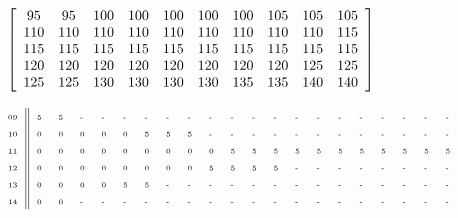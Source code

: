 \bigskip\ $\left[
\begin{array}
[c]{cccccccccc}%
95 & 95 & 100 & 100 & 100 & 100 & 100 & 105 & 105 & 105\\
110 & 110 & 110 & 110 & 110 & 110 & 110 & 110 & 110 & 115\\
115 & 115 & 115 & 115 & 115 & 115 & 115 & 115 & 115 & 115\\
120 & 120 & 120 & 120 & 120 & 120 & 120 & 120 & 125 & 125\\
125 & 125 & 130 & 130 & 130 & 130 & 135 & 135 & 140 & 140
\end{array}
\right]  \allowbreak$

$\text{%
\begin{tabular}
[c]{l||llllllllllllllllllll}%
{\tiny 09} & {\tiny 5} & {\tiny 5} & {\tiny -} & {\tiny -} & {\tiny -} &
{\tiny -} & {\tiny -} & {\tiny -} & {\tiny -} & {\tiny -} & {\tiny -} &
{\tiny -} & {\tiny -} & {\tiny -} & {\tiny -} & {\tiny -} & {\tiny -} &
{\tiny -} & {\tiny -} & {\tiny -}\\
{\tiny 10} & {\tiny 0} & {\tiny 0} & {\tiny 0} & {\tiny 0} & {\tiny 0} &
{\tiny 5} & {\tiny 5} & {\tiny 5} & {\tiny -} & {\tiny -} & {\tiny -} &
{\tiny -} & {\tiny -} & {\tiny -} & {\tiny -} & {\tiny -} & {\tiny -} &
{\tiny -} & {\tiny -} & {\tiny -}\\
{\tiny 11} & {\tiny 0} & {\tiny 0} & {\tiny 0} & {\tiny 0} & {\tiny 0} &
{\tiny 0} & {\tiny 0} & {\tiny 0} & {\tiny 0} & {\tiny 5} & {\tiny 5} &
{\tiny 5} & {\tiny 5} & {\tiny 5} & {\tiny 5} & {\tiny 5} & {\tiny 5} &
{\tiny 5} & {\tiny 5} & {\tiny 5}\\
{\tiny 12} & {\tiny 0} & {\tiny 0} & {\tiny 0} & {\tiny 0} & {\tiny 0} &
{\tiny 0} & {\tiny 0} & {\tiny 0} & {\tiny 5} & {\tiny 5} & {\tiny 5} &
{\tiny 5} & {\tiny -} & {\tiny -} & {\tiny -} & {\tiny -} & {\tiny -} &
{\tiny -} & {\tiny -} & {\tiny -}\\
{\tiny 13} & {\tiny 0} & {\tiny 0} & {\tiny 0} & {\tiny 0} & {\tiny 5} &
{\tiny 5} & {\tiny -} & {\tiny -} & {\tiny -} & {\tiny -} & {\tiny -} &
{\tiny -} & {\tiny -} & {\tiny -} & {\tiny -} & {\tiny -} & {\tiny -} &
{\tiny -} & {\tiny -} & {\tiny -}\\
{\tiny 14} & {\tiny 0} & {\tiny 0} & {\tiny -} & {\tiny -} & {\tiny -} &
{\tiny -} & {\tiny -} & {\tiny -} & {\tiny -} & {\tiny -} & {\tiny -} &
{\tiny -} & {\tiny -} & {\tiny -} & {\tiny -} & {\tiny -} & {\tiny -} &
{\tiny -} & {\tiny -} & {\tiny -}%
\end{tabular}
}$

{\tiny \bigskip}

